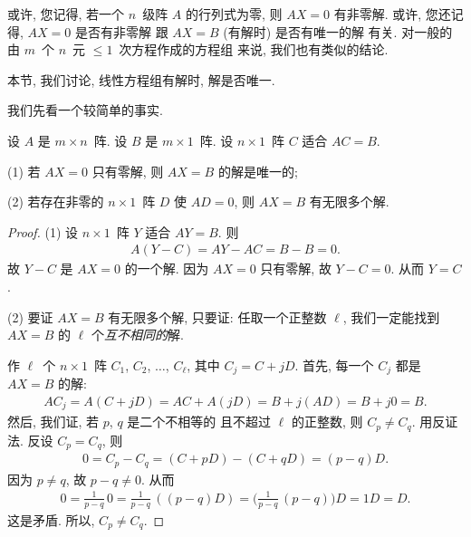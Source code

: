 或许, 您记得,
若一个 \(n\)~级阵 \(A\) 的行列式为零,
则 \(AX = 0\) 有非零解.
或许, 您还记得,
\(AX = 0\) 是否有非零解%
跟 \(AX = B\) (有解时) 是否有唯一的解%
有关.
对一般的%
由 \(m\)~个 \(n\)~元 \({\leq} 1\)~次方程作成的方程组%
来说, 我们也有类似的结论.

本节, 我们讨论, 线性方程组有解时, 解是否唯一.

我们先看一个较简单的事实.

\begin{theorem}
    设 \(A\) 是 \(m \times n\)~阵.
    设 \(B\) 是 \(m \times 1\)~阵.
    设 \(n \times 1\)~阵 \(C\) 适合 \(AC = B\).

    (1)
    若 \(AX = 0\) 只有零解, 则 \(AX = B\) 的解是唯一的;

    (2)
    若存在非零的 \(n \times 1\)~阵 \(D\)
    使 \(AD = 0\),
    则 \(AX = B\) 有无限多个解.
\end{theorem}

\begin{proof}
    (1)
    设 \(n \times 1\)~阵 \(Y\) 适合 \(AY = B\).
    则
    \begin{align*}
        A(Y - C) = AY - AC = B - B = 0.
    \end{align*}
    故 \(Y - C\) 是 \(AX = 0\) 的一个解.
    因为 \(AX = 0\) 只有零解,
    故 \(Y - C = 0\).
    从而 \(Y = C\).

    (2)
    要证 \(AX = B\) 有无限多个解,
    只要证:
    任取一个正整数 \(\ell\),
    我们一定能找到 \(AX = B\) 的
    \(\ell\) 个\emph{互不相同的}解.

    作 \(\ell\)~个 \(n \times 1\)~阵
    \(C_1\), \(C_2\), \(\dots\), \(C_\ell\),
    其中 \(C_j = C + jD\).
    首先, 每一个 \(C_j\) 都是 \(AX = B\) 的解:
    \begin{align*}
        AC_j = A(C + jD) = AC + A(jD) = B + j(AD) = B + j0 = B.
    \end{align*}
    然后, 我们证,
    若 \(p\), \(q\) 是二个不相等的%
    且不超过 \(\ell\) 的正整数,
    则 \(C_p \neq C_q\).
    用反证法.
    反设 \(C_p = C_q\),
    则
    \begin{align*}
        0 = C_p - C_q = (C + pD) - (C + qD) = (p - q)D.
    \end{align*}
    因为 \(p \neq q\), 故 \(p - q \neq 0\).
    从而
    \begin{align*}
        0 = \frac{1}{p-q}\, 0
        = \frac{1}{p-q}\, ((p-q)D)
        = \Big( \frac{1}{p-q}\, (p-q) \Big) D
        = 1D
        = D.
    \end{align*}
    这是矛盾.
    所以, \(C_p \neq C_q\).
\end{proof}

